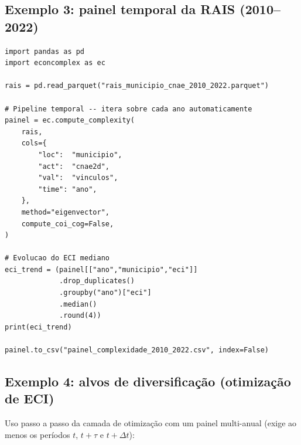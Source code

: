 \documentclass[12pt, a4paper]{article}
\begin{document}
\subsection{Exemplo 3: painel temporal da RAIS (2010--2022)}

\begin{lstlisting}[caption={Pipeline com dados em painel --- multiplos periodos}]
import pandas as pd
import econcomplex as ec

rais = pd.read_parquet("rais_municipio_cnae_2010_2022.parquet")

# Pipeline temporal -- itera sobre cada ano automaticamente
painel = ec.compute_complexity(
    rais,
    cols={
        "loc":  "municipio",
        "act":  "cnae2d",
        "val":  "vinculos",
        "time": "ano",
    },
    method="eigenvector",
    compute_coi_cog=False,
)

# Evolucao do ECI mediano
eci_trend = (painel[["ano","municipio","eci"]]
             .drop_duplicates()
             .groupby("ano")["eci"]
             .median()
             .round(4))
print(eci_trend)

painel.to_csv("painel_complexidade_2010_2022.csv", index=False)
\end{lstlisting}

\subsection{Exemplo 4: alvos de diversifica\c{c}\~{a}o (otimiza\c{c}\~{a}o de ECI)}

Uso passo a passo da camada de otimiza\c{c}\~{a}o com um painel
multi-anual (exige ao menos os per\'{i}odos $t$, $t+\tau$ e $t+\Delta t$):
\end{document}
